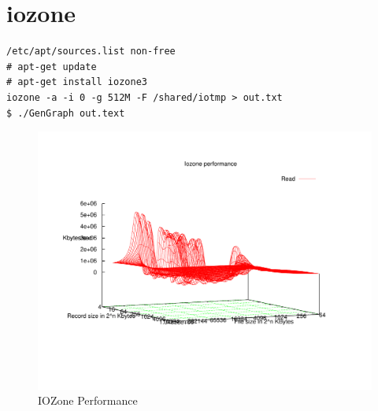 \section{iozone}
\begin{lstlisting}[style=Bash]
/etc/apt/sources.list non-free
# apt-get update
# apt-get install iozone3
iozone -a -i 0 -g 512M -F /shared/iotmp > out.txt
$ ./GenGraph out.text
\end{lstlisting}
\begin{figure}[H]
	\centering
	\includegraphics[scale=0.7]{read.pdf}
	\caption{IOZone Performance}
\end{figure}
